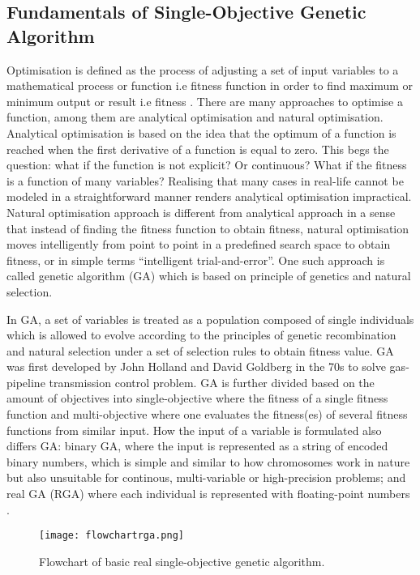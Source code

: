 \subsection{Fundamentals of Single-Objective Genetic Algorithm}
\label{sec:12}
Optimisation is defined as the process of adjusting a set of input variables to a mathematical process or function i.e fitness function in order to find maximum or minimum output or result i.e fitness \citep{haupt}. There are many approaches to optimise a function, among them are analytical optimisation and natural optimisation. Analytical optimisation is based on the idea that the optimum of a function is reached when the first derivative of a function is equal to zero. This begs the question: what if the function is not explicit? Or continuous? What if the fitness is a function of many variables? Realising that many cases in real-life cannot be modeled in a straightforward manner renders analytical optimisation impractical. Natural optimisation approach is different from analytical approach in a sense that instead of finding the fitness function to obtain fitness, natural optimisation moves intelligently from point to point in a predefined search space to obtain fitness, or in simple terms ``intelligent trial-and-error''. One such approach is called genetic algorithm (GA) which is based on principle of genetics and natural selection.\par
In GA, a set of variables is treated as a population composed of single individuals which is allowed to evolve according to the principles of genetic recombination and natural selection under  a set of selection rules to obtain fitness value. GA was first developed by John Holland and David Goldberg in the 70s to solve gas-pipeline transmission control problem. GA is further divided based on the amount of objectives into single-objective where the fitness of a single fitness function and multi-objective where one evaluates the fitness(es) of several fitness functions from similar input. How the input of a variable is formulated also differs GA: binary GA, where the input is represented as a string of encoded binary numbers, which is simple and similar to how chromosomes work in nature but also unsuitable for continous, multi-variable or high-precision problems; and real GA (RGA) where each individual is represented with floating-point numbers \citep{haupt}.\par
\begin{figure}[H]
    \centering
    \texttt{[image: flowchartrga.png]}
    \caption{Flowchart of basic real single-objective genetic algorithm.}
    \label{fig:flowchartrga}
\end{figure}
